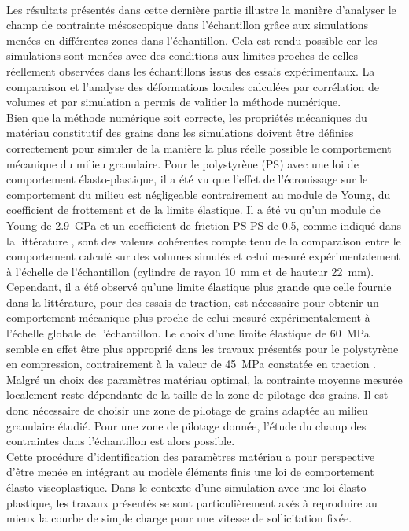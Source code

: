 \paragraph{}
	Les résultats présentés dans cette dernière partie illustre la manière d'analyser le champ de contrainte mésoscopique dans l'échantillon grâce aux simulations menées en différentes zones dans l'échantillon. Cela est rendu possible car les simulations sont menées avec des conditions aux limites proches de celles réellement observées dans les échantillons issus des essais expérimentaux. La comparaison et l'analyse des déformations locales calculées par corrélation de volumes et par simulation a permis de valider la méthode numérique.
	\\Bien que la méthode numérique soit correcte, les propriétés mécaniques du matériau constitutif des grains dans les simulations doivent être définies correctement pour simuler de la manière la plus réelle possible le comportement mécanique du milieu granulaire. Pour le polystyrène (PS) avec une loi de comportement élasto-plastique, il a été vu que l'effet de l'écrouissage sur le comportement du milieu est négligeable contrairement au module de Young, du coefficient de frottement et de la limite élastique. Il a été vu qu'un module de Young de \SI{2.9}{\giga\pascal} et un coefficient de friction PS-PS de \num{0.5}, comme indiqué dans la littérature \citep{wypych_handbook_2016, matweb}, sont des valeurs cohérentes compte tenu de la comparaison entre le comportement calculé sur des volumes simulés et celui mesuré expérimentalement à l'échelle de l'échantillon (cylindre de rayon \SI{10}{\milli\meter} et de hauteur \SI{22}{\milli\meter}). Cependant, il a été observé qu'une limite élastique plus grande que celle fournie dans la littérature, pour des essais de traction, est nécessaire pour obtenir un comportement mécanique plus proche de celui mesuré expérimentalement à l'échelle globale de l'échantillon. Le choix d'une limite élastique de \SI{60}{\mega\pascal} semble en effet être plus approprié dans les travaux présentés pour le polystyrène en compression, contrairement à la valeur de \SI{45}{\mega\pascal} constatée en traction \citep{wypych_handbook_2016}.
	\\Malgré un choix des paramètres matériau optimal, la contrainte moyenne mesurée localement reste dépendante de la taille de la zone de pilotage des grains. Il est donc nécessaire de choisir une zone de pilotage de grains adaptée au milieu granulaire étudié. Pour une zone de pilotage donnée, l'étude du champ des contraintes dans l'échantillon est alors possible.
	\\Cette procédure d’identification des paramètres matériau a pour perspective d’être menée en intégrant au modèle éléments finis une loi de comportement élasto-viscoplastique. Dans le contexte d’une simulation avec une loi élasto-plastique, les travaux présentés se sont particulièrement axés à reproduire au mieux la courbe de simple charge pour une vitesse de sollicitation fixée.